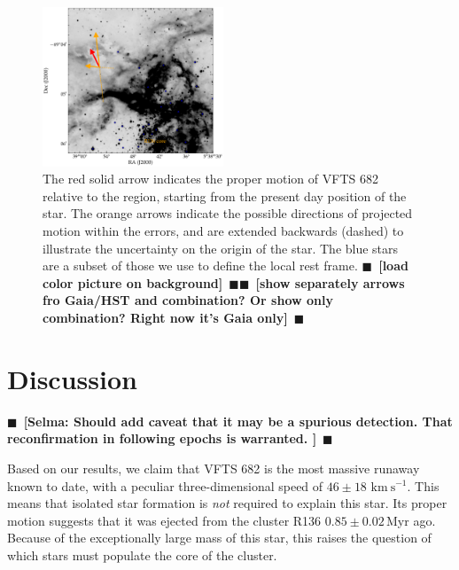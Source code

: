\documentclass[apjl,twocolumn]{emulateapj}
\newcommand{\todo}[1]{{\large $\blacksquare$~\textbf{\color{red}[#1]}}~$\blacksquare$}
\newcommand{\kms}{{\,\mathrm{km\ s^{-1}}}}
\begin{document}
\begin{figure}[tbp]
  \centering
  \includegraphics[width=0.48\textwidth]{./figures/main_plot_good}  
  \caption{The red solid arrow indicates the proper motion of VFTS 682
    relative to the region, starting from the present day position of
    the star. The orange arrows indicate the possible
    directions of projected motion within the errors, and are extended
    backwards (dashed) to illustrate the uncertainty on the origin of the
    star. The blue stars
    are a subset of those we use to define the local rest
    frame. \todo{load color picture on background}\todo{show
      separately arrows fro Gaia/HST and combination? Or show only
      combination? Right now it's Gaia only}}
  
  \label{fig:main}
\end{figure}


\section{Discussion}
\label{sec:discussion}
\todo{Selma: Should add caveat that it may be a spurious detection. That reconfirmation in following epochs is warranted. }

Based on our results, we claim that VFTS 682 is the most massive
runaway known to date, with a peculiar three-dimensional speed of $46\pm18\,\kms$. This means that isolated star formation is
\emph{not} required to explain this star. Its proper motion suggests that it was ejected from the cluster R136
$0.85\pm0.02$\,Myr ago. Because of the exceptionally large mass
of this star, this raises the question of which stars must populate
the core of the cluster.
\end{document}

